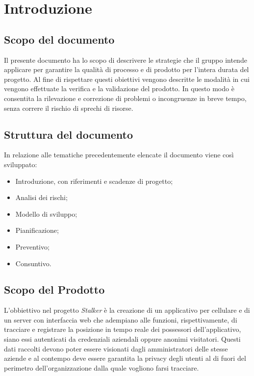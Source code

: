 \section{Introduzione}
\subsection{Scopo del documento}
Il presente documento ha lo scopo di descrivere le strategie che il gruppo \Gruppo{} intende applicare per garantire la qualità di processo e di prodotto per l’intera durata del progetto.
Al fine di rispettare questi obiettivi vengono descritte le modalità in cui vengono effettuate la verifica e la validazione del prodotto.
In questo modo è consentita la rilevazione e correzione di problemi o incongruenze in breve tempo, senza correre il rischio di sprechi di risorse.

\subsection{Struttura del documento}
In relazione alle tematiche precedentemente elencate il documento viene così sviluppato:
\begin{itemize}
    \item Introduzione, con riferimenti e scadenze di progetto;
    \item Analisi dei rischi;
    \item Modello di sviluppo;
    \item Pianificazione;
    \item Preventivo;
    \item Consuntivo.
\end{itemize}

\subsection{Scopo del Prodotto}
L'obbiettivo nel progetto \textit{Stalker} è la creazione di un applicativo per cellulare e di un server con interfaccia web che adempiano alle funzioni, rispettivamente, di 
tracciare e registrare la posizione in tempo reale dei possessori dell'applicativo, siano essi autenticati da credenziali aziendali oppure anonimi visitatori.
Questi dati raccolti devono poter essere visionati dagli amministratori delle stesse aziende e al contempo deve essere garantita la privacy degli utenti al di fuori del perimetro dell'organizzazione dalla quale vogliono farsi tracciare.

